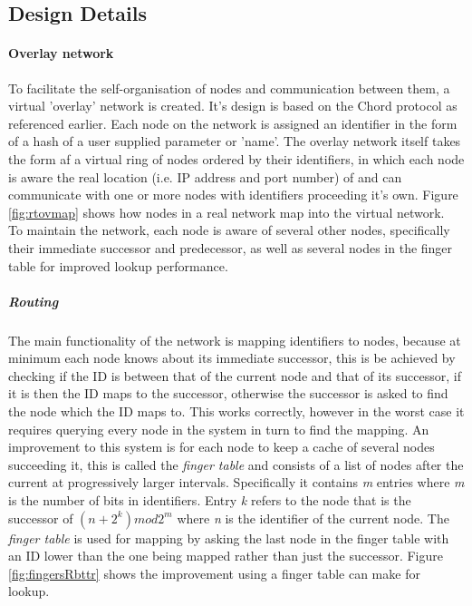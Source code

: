 \documentclass{article}
\begin{document}
\subsection{Design Details}

\paragraph{Overlay network}
To facilitate the self-organisation of nodes and communication between them, a virtual 'overlay' network is created. It's design is based on the Chord protocol as referenced earlier. Each node on the network is assigned an identifier in the form of a hash of a user supplied parameter or 'name'. The overlay network itself takes the form af a virtual ring of nodes ordered by their identifiers, in which each node is aware the real location (i.e. IP address and port number) of and can communicate with one or more nodes with identifiers proceeding it's own. Figure \ref{fig:rtovmap} shows how nodes in a real network map into the virtual network.
\\
To maintain the network, each node is aware of several other nodes, specifically their immediate successor and predecessor, as well as several nodes in the finger table for improved lookup performance.

\subparagraph{Routing} The main functionality of the network is mapping identifiers to nodes, because at minimum each node knows about its immediate successor, this is be achieved by checking if the ID is between that of the current node and that of its successor, if it is then the ID maps to the successor, otherwise the successor is asked to find the node which the ID maps to. 
This works correctly, however in the worst case it requires querying every node in the system in turn to find the mapping. 
An improvement to this system is for each node to keep a cache of several nodes succeeding it, this is called the \textit{finger table} and consists of a list of nodes after the current at progressively larger intervals.
Specifically it contains \textit{m} entries where \textit{m} is the number of bits in identifiers. Entry \textit{k} refers to the node that is the successor of $(n + 2^k) mod 2^m$ where \textit{n} is the identifier of the current node.
The \textit{finger table} is used for mapping by asking the last node in the finger table with an ID lower than the one being mapped rather than just the successor.
Figure \ref{fig:fingersRbttr} shows the improvement using a finger table can make for lookup.
\end{document}
